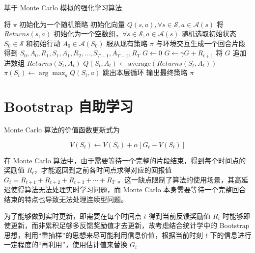 \begin{algorithm}[H]
    \caption{基于 Monte Carlo 模拟的强化学习算法}
    \begin{algorithmic}[1] %
        \State 将 $\pi$ 初始化为一个随机策略
        \State 初始化向量 $Q(s,a), \forall s\in \mathcal S,a\in \mathcal{A}(s)$
        \State 将 $Returns(s,a)$ 初始化为一个空数组，$\forall s\in\mathcal S,a\in\mathcal{A}(s)$
        \Loop
        \State 随机选取初始状态 $S_0\in\mathcal S$ 和初始行动 $A_0\in\mathcal{A}(S_0)$
        \State 服从现有策略 $\pi$ 与环境交互生成一个回合片段
        \State 得到 $S_{0}, A_{0}, R_{1}, S_{1}, A_{1}, R_{2}, \ldots, S_{T-1}, A_{T-1}, R_{T}$
        \State $G\leftarrow 0$
        \State $G \leftarrow \gamma G+R_{t+1}$
        \State 将 $G$ 追加进数组 $Returns(S_t,A_t)$
        \State $Q(S_t,A_t)\leftarrow \mathrm{average}(Returns(S_t,A_t))$
        \State $\pi(S_t)\leftarrow \arg\max_aQ(S_t,a)$
        \State 跳出本层循环
        \EndIf
        \EndFor
        \EndLoop
        \State
        \State 输出最终策略 $\pi$
    \end{algorithmic}
\end{algorithm}

\section{Bootstrap 自助学习}

Monte Carlo 算法的价值函数更新式为

\begin{equation}\label{eq:mcupdate}
    V(S_t)\leftarrow V(S_t)+\alpha\left[G_t-V(S_t)\right]
\end{equation}

在 Monte Carlo 算法中，由于需要等待一个完整的片段结束，得到每个时间点的奖励值 $R_t$，才能返回到之前各时间点求得对应的回报值 $G_t = R_{t+1}+R_{t+2}+R_{t+3}+\cdots+R_T$ 。这一缺点限制了算法的使用场景，其高延迟使得算法无法处理实时学习问题，而 Monte Carlo 本身需要等待一个完整回合结束的特点也导致无法处理连续型问题。

为了能够做到实时更新，即需要在每个时间点 $t$ 得到当前反馈奖励值 $R_t$ 时能够即使更新，而非累积足够多反馈奖励值才去更新，故考虑结合统计学中的 Bootstrap 思想\cite{efron1994introduction}\cite{2014wzjstatistics}，利用“重抽样”的思想来尽可能利用信息价值，根据当前时刻 $t$ 下的信息进行一定程度的“再利用”，使用估计值来替换 $G_t$

